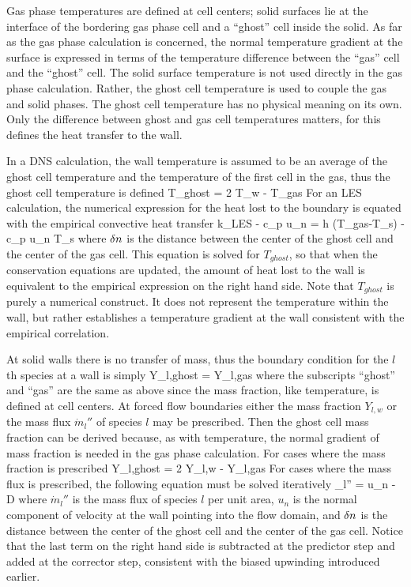 \documentclass[11pt]{book}
\begin{document}
Gas phase temperatures are defined at cell centers; solid surfaces lie at the
interface of the bordering gas phase cell and a ``ghost'' cell inside the
solid. As far as the gas phase calculation is concerned,
the normal temperature gradient at the surface is expressed in terms of
the temperature difference between the ``gas'' cell and the ``ghost'' cell.
The solid surface temperature is not used directly in the gas phase calculation.
Rather, the ghost cell temperature is used to couple the gas and solid phases.
The ghost cell temperature
has no physical meaning on its own. Only the difference between ghost and
gas cell temperatures matters, for this defines the heat transfer to the
wall.

In a DNS calculation, the wall temperature is assumed to be an average of the
ghost cell temperature and the temperature of the first cell in the gas,
thus the ghost cell temperature is defined
\be T_{ghost} =  2 T_w - T_{gas}  \ee
For an LES calculation, the numerical expression for the heat lost to the boundary is
equated with the empirical convective heat transfer
\be k_{\hbox{\tiny LES}}  - c_p u_n \rho {}
   = h \; (T_{gas}-T_s) - c_p u_n \rho T_s  \ee
where $\delta n$ is the distance between the center of the ghost cell
and the center of the gas cell. This equation is solved for $T_{ghost}$,
so that when the conservation equations are updated, the amount of heat
lost to the wall is equivalent to the empirical expression on the right
hand side. Note that $T_{ghost}$ is purely a numerical construct. It does
not represent the temperature within the wall, but rather establishes
a temperature gradient at the wall consistent with the empirical
correlation.

At solid walls there is no transfer of mass, thus the boundary condition
for the $l$th species at a wall is simply
\be Y_{l,ghost} = Y_{l,gas} \ee
where the subscripts ``ghost'' and ``gas'' are the same as above since
the mass fraction, like temperature, is defined at cell centers.
At forced flow boundaries either the mass fraction $Y_{l,w}$ or
the mass flux $\dot{m}_l''$ of species $l$ may be prescribed.
Then the ghost cell mass fraction can be derived because, as with
temperature, the normal gradient of mass fraction is needed in the gas phase
calculation.
For cases where the mass fraction is prescribed
\be Y_{l,ghost} = 2 Y_{l,w} - Y_{l,gas}  \ee
For cases where the mass flux is prescribed,
the following equation must be solved iteratively
\be {}_l'' = u_n 
  - \rho D 
  \mp {}  \ee
where $\dot{m}_l''$ is the mass flux of species $l$ per unit area,
$u_n$ is the normal component of velocity at the wall pointing into
the flow domain, and $\delta n$ is the distance between the center of the ghost
cell and the center of the gas cell. Notice that the last term on the
right hand side is subtracted at the predictor step and added at the
corrector step, consistent with the biased upwinding introduced earlier.
\end{document}
